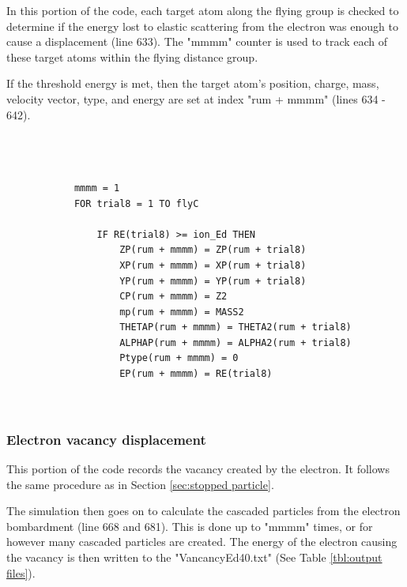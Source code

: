 \documentclass[10pt, reqno]{exam}
\begin{document}
In this portion of the code, each target atom along the flying group is checked to determine if the energy lost to elastic scattering from the electron was enough to cause a displacement (line 633). The "mmmm" counter is used to track each of these target atoms within the flying distance group. \par

If the threshold energy is met, then the target atom's position, charge, mass, velocity vector, type, and energy are set at index "rum + mmmm" (lines 634 - 642). \par

\begin{verbatim}
    
    
    
            mmmm = 1
            FOR trial8 = 1 TO flyC
    
                IF RE(trial8) >= ion_Ed THEN
                    ZP(rum + mmmm) = ZP(rum + trial8)
                    XP(rum + mmmm) = XP(rum + trial8)
                    YP(rum + mmmm) = YP(rum + trial8)
                    CP(rum + mmmm) = Z2
                    mp(rum + mmmm) = MASS2
                    THETAP(rum + mmmm) = THETA2(rum + trial8)
                    ALPHAP(rum + mmmm) = ALPHA2(rum + trial8)
                    Ptype(rum + mmmm) = 0
                    EP(rum + mmmm) = RE(trial8)
    
    
\end{verbatim}

\subsubsection{Electron vacancy displacement}

This portion of the code records the vacancy created by the electron. It follows the same procedure as in Section \ref{sec:stopped particle}. \par

The simulation then goes on to calculate the cascaded particles from the electron bombardment (line 668 and 681). This is done up to "mmmm" times, or for however many cascaded particles are created. The energy of the electron causing the vacancy is then written to the "VancancyEd40.txt" (See Table \ref{tbl:output files}). \par
\end{document}
